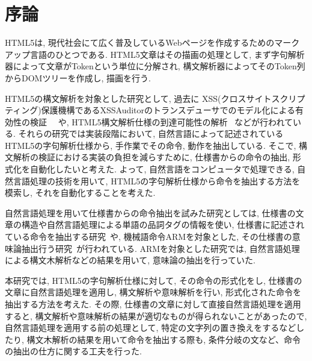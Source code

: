 \documentclass[uplatex,a4j]{jsreport}
\begin{document}
\chapter{序論}

HTML5は, 現代社会にて広く普及しているWebページを作成するためのマークアップ言語のひとつである.
HTML5文章はその描画の処理として, まず字句解析器によって文章がTokenという単位に分解され, 構文解析器によってそのToken列からDOMツリーを作成し, 描画を行う.%

HTML5の構文解析を対象とした研究として, 過去に
XSS(クロスサイトスクリプティング)保護機構であるXSSAuditorのトランスデューサでのモデル化による有効性の検証~\cite{XSSAuditor} ~\cite{トランスデューサの包含関係}や, 
HTML5構文解析仕様の到達可能性の解析 ~\cite{HTML5Testing}などが行われている. 
それらの研究では実装段階において, 自然言語によって記述されているHTML5の字句解析仕様から, 手作業でその命令, 動作を抽出している. 
そこで, 構文解析の検証における実装の負担を減らすために, 仕様書からの命令の抽出,  形式化を自動化したいと考えた. 
よって, 自然言語をコンピュータで処理できる, 自然言語処理の技術を用いて, HTML5の字句解析仕様から命令を抽出する方法を模索し, それを自動化することを考えた.

自然言語処理を用いて仕様書からの命令抽出を試みた研究としては, 
仕様書の文章の構造や自然言語処理による単語の品詞タグの情報を使い, 仕様書に記述されている命令を抽出する研究~\cite{7272551}や, 
機械語命令ARMを対象とした, その仕様書の意味論抽出行う研究~\cite{arm}が行われている. 
ARMを対象とした研究では, 自然言語処理による構文木解析などの結果を用いて, 意味論の抽出を行っていた.

本研究では, HTML5の字句解析仕様に対して, その命令の形式化をし, 仕様書の文章に自然言語処理を適用し, 構文解析や意味解析を行い, 形式化された命令を抽出する方法を考えた. 
その際, 仕様書の文章に対して直接自然言語処理を適用すると, 構文解析や意味解析の結果が適切なものが得られないことがあったので, 自然言語処理を適用する前の処理として, 特定の文字列の置き換えをするなどしたり, 
構文木解析の結果を用いて命令を抽出する際も, 条件分岐の文など、命令の抽出の仕方に関する工夫を行った. 
\end{document}
